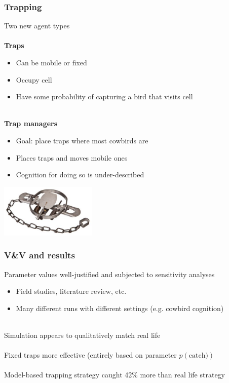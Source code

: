 \documentclass{beamer}
\begin{document}
\begin{frame}
	\frametitle{Trapping}
	Two new agent types \\~\\
	
	\textbf{Traps} 
	\begin{itemize}
		\item \small Can be mobile or fixed
		\item \small Occupy cell
		\item \small Have some probability of capturing a bird that visits cell \\~\\
	\end{itemize}
	
	\textbf{Trap managers}
	\begin{itemize}
		\item \small Goal: place traps where most cowbirds are
		\item \small Places traps and moves mobile ones
		\item \small Cognition for doing so is under-described
	\end{itemize}

	\begin{center}
		\includegraphics[height=1.0in, keepaspectratio]{trap.jpeg}
	\end{center}

\end{frame}

\begin{frame}
	\frametitle{V\&V and results}
	
	Parameter values well-justified and subjected to sensitivity analyses
	\begin{itemize}
		\item \small Field studies, literature review, etc.
		\item \small Many different runs with different settings (e.g. cowbird cognition) \\~\\
	\end{itemize}

	Simulation appears to qualitatively match real life \\~\\

	Fixed traps more effective (entirely based on parameter $p(\mathrm{catch)})$\\~\\

	Model-based trapping strategy caught 42\% more than real life strategy
\end{frame}
\end{document}

